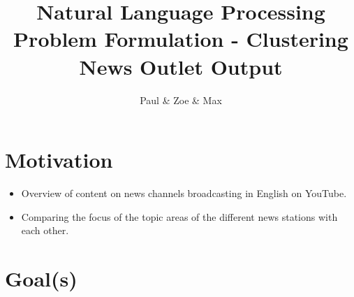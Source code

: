 \documentclass[12pt,a4paper]{scrartcl}
\title{\textbf{Natural Language Processing} \\[0.5em] \large{\textbf{Problem Formulation - Clustering News Outlet Output} \\[0.5em]} }
\date{}
\author{Paul \& Zoe \& Max}
\begin{document}
\maketitle
\section{Motivation}
\begin{itemize}
    \item Overview of content on news channels broadcasting in English on YouTube.
    \item Comparing the focus of the topic areas of the different news stations with each other.
\end{itemize}
\section{Goal(s)}
\end{document}
